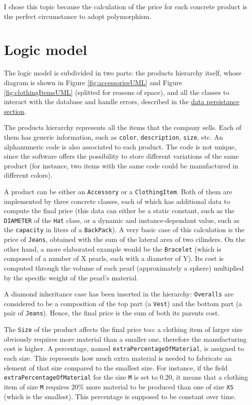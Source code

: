 \documentclass[10pt]{article}
\begin{document}
I chose this topic because the calculation of the price for each concrete
product is the perfect circumstance to adopt polymorphism.

\section{Logic model}
The logic model is subdivided in two parts: the products hierarchy itself,
whose diagram is shown in Figure \ref{fig:accessoriesUML} and Figure
\ref{fig:clothingItemsUML} (splitted for reasons of space), and all the classes
to interact with the database and handle errors, described in the
\hyperref[sec:dataPersistance]{data persistance section}.

The products hierarchy represents all the items that the company sells. Each of
them has generic information, such as \texttt{color}, \texttt{description},
\texttt{size}, etc. An alphanumeric code is also associated to each product.
The code is not unique, since the software offers the possibility to store
different variations of the same product (for instance, two items with the same
code could be manufactured in different colors).

A product can be either an \texttt{Accessory} or a \texttt{ClothingItem}. Both
of them are implemented by three concrete classes, each of which has additional
data to compute the final price (this data can either be a static constant,
such as the \texttt{DIAMETER} of the \texttt{Hat} class, or a dynamic and
instance-dependant value, such as the \texttt{capacity} in liters of a
\texttt{BackPack}). A very basic case of this calculation is the price of
\texttt{Jeans}, obtained with the sum of the lateral area of two cilinders. On
the other hand, a more elaborated example would be the \texttt{Bracelet} (which
is composed of a number of X pearls, each with a diameter of Y). Its cost is
computed through the volume of each pearl (approximately a sphere) multiplied
by the specific weight of the pearl's material.

A diamond inheritance case has been inserted in the hierarchy:
\texttt{Overalls} are considered to be a composition of the top part (a
\texttt{Vest}) and the bottom part (a pair of \texttt{Jeans}). Hence, the final
price is the sum of both its parents cost.

The \texttt{Size} of the product affects the final price too: a clothing item
of larger size obviously requires more material than a smaller one, therefore
the manufacturing cost is higher. A percentage, named
\texttt{extraPercentageOfMaterial}, is assigned to each size. This represents
how much extra material is needed to fabricate an element of that size compared
to the smallest size. For instance, if the field
\texttt{extraPercentageOfMaterial} for the size \texttt{M} is set to 0.20, it
means that a clothing item of size \texttt{M} requires $20\%$ more material to
be produced than one of size \texttt{XS} (which is the smallest). This
percentage is supposed to be constant over time.
\end{document}
